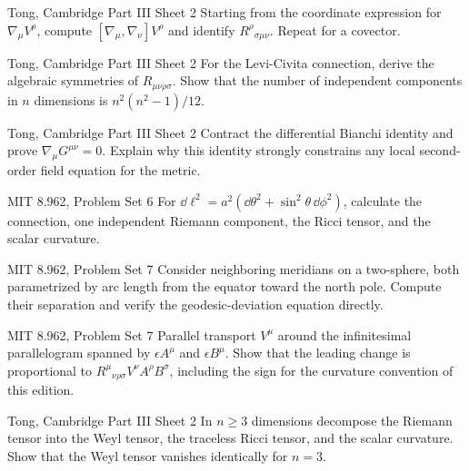 \begin{exercises}

\begin{exercise}{Tong, Cambridge Part III Sheet 2}
Starting from the coordinate expression for \(\nabla_\mu V^\rho\), compute
\([\nabla_\mu,\nabla_\nu]V^\rho\) and identify
\(R^\rho{}_{\sigma\mu\nu}\).  Repeat for a covector.
\end{exercise}

\begin{exercise}{Tong, Cambridge Part III Sheet 2}
For the Levi-Civita connection, derive the algebraic symmetries of
\(R_{\mu\nu\rho\sigma}\).  Show that the number of independent components in
\(n\) dimensions is \(n^2(n^2-1)/12\).
\end{exercise}

\begin{exercise}{Tong, Cambridge Part III Sheet 2}
Contract the differential Bianchi identity and prove
\(\nabla_\mu G^{\mu\nu}=0\).  Explain why this identity strongly constrains
any local second-order field equation for the metric.
\end{exercise}

\begin{exercise}{MIT 8.962, Problem Set 6}
For
\(\dd\ell^2=a^2(\dd\theta^2+\sin^2\theta\,\dd\phi^2)\), calculate the
connection, one independent Riemann component, the Ricci tensor, and the
scalar curvature.
\end{exercise}

\begin{exercise}{MIT 8.962, Problem Set 7}
Consider neighboring meridians on a two-sphere, both parametrized by arc
length from the equator toward the north pole.  Compute their separation and
verify the geodesic-deviation equation directly.
\end{exercise}

\begin{exercise}{MIT 8.962, Problem Set 7}
Parallel transport \(V^\mu\) around the infinitesimal parallelogram spanned by
\(\epsilon A^\mu\) and \(\epsilon B^\mu\).  Show that the leading change is
proportional to
\(R^\mu{}_{\nu\rho\sigma}V^\nu A^\rho B^\sigma\), including the sign for the
curvature convention of this edition.
\end{exercise}

\begin{exercise}{Tong, Cambridge Part III Sheet 2}
In \(n\geq3\) dimensions decompose the Riemann tensor into the Weyl tensor,
the traceless Ricci tensor, and the scalar curvature.  Show that the Weyl
tensor vanishes identically for \(n=3\).
\end{exercise}


\end{exercises}
